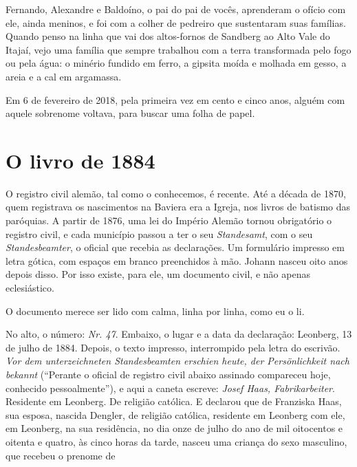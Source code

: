 \documentclass[
  brazilian,
  11pt,
  openany]{book}
\begin{document}
Fernando, Alexandre e Baldoíno, o pai do pai de vocês, aprenderam o
ofício com ele, ainda meninos, e foi com a colher de pedreiro que
sustentaram suas famílias. Quando penso na linha que vai dos
altos-fornos de Sandberg ao Alto Vale do Itajaí, vejo uma família que
sempre trabalhou com a terra transformada pelo fogo ou pela água: o
minério fundido em ferro, a gipsita moída e molhada em gesso, a areia e
a cal em argamassa.

Em 6 de fevereiro de 2018, pela primeira vez em cento e cinco anos,
alguém com aquele sobrenome voltava, para buscar uma folha de papel.

\section{O livro de 1884}\label{o-livro-de-1884}

O registro civil alemão, tal como o conhecemos, é recente. Até a década
de 1870, quem registrava os nascimentos na Baviera era a Igreja, nos
livros de batismo das paróquias. A partir de 1876, uma lei do Império
Alemão tornou obrigatório o registro civil, e cada município passou a
ter o seu \emph{Standesamt}, com o seu \emph{Standesbeamter}, o oficial
que recebia as declarações. Um formulário impresso em letra gótica, com
espaços em branco preenchidos à mão. Johann nasceu oito anos depois
disso. Por isso existe, para ele, um documento civil, e não apenas
eclesiástico.

O documento merece ser lido com calma, linha por linha, como eu o li.

No alto, o número: \emph{Nr. 47}. Embaixo, o lugar e a data da
declaração: Leonberg, 13 de julho de 1884. Depois, o texto impresso,
interrompido pela letra do escrivão. \emph{Vor dem unterzeichneten
Standesbeamten erschien heute, der Persönlichkeit nach bekannt}
(``Perante o oficial de registro civil abaixo assinado compareceu hoje,
conhecido pessoalmente''), e aqui a caneta escreve: \emph{Josef Haas,
Fabrikarbeiter}. Residente em Leonberg. De religião católica. E declarou
que de Franziska Haas, sua esposa, nascida Dengler, de religião
católica, residente em Leonberg com ele, em Leonberg, na sua residência,
no dia onze de julho do ano de mil oitocentos e oitenta e quatro, às
cinco horas da tarde, nasceu uma criança do sexo masculino, que recebeu
o prenome de
\end{document}

